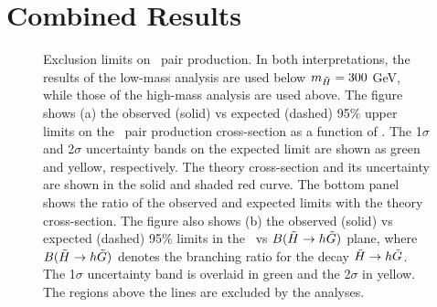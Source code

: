 \section{Combined Results}

\begin{figure}[htbp]
	\centering
	\caption{Exclusion limits on \hino\ pair production. In both interpretations, the results of the low-mass analysis are used below $m_{\tilde{H}} = 300$ GeV, while those of the high-mass analysis are used above. The figure shows (a) the observed (solid) vs expected (dashed) 95\% upper limits on the \hino\ pair production cross-section as a function of \mhino.  The 1$\sigma$ and 2$\sigma$ uncertainty bands on the expected limit are shown as green and yellow, respectively. The theory cross-section and its uncertainty are shown in the solid and shaded red curve. The bottom panel shows the ratio of the observed and expected limits with the theory cross-section. The figure also shows (b) the observed (solid) vs expected (dashed) 95\% limits in the \mhino\ vs $B(\tilde{H}\rightarrow h \tilde{G})$ plane, where $B(\tilde{H}\rightarrow h \tilde{G})$ denotes the branching ratio for the decay $\tilde{H} \rightarrow h \tilde{G}$. The 1$\sigma$ uncertainty band is overlaid in green and the 2$\sigma$ in yellow. The regions above the lines are excluded by the analyses.} 
	\label{fig:exclusion}
\end{figure}

